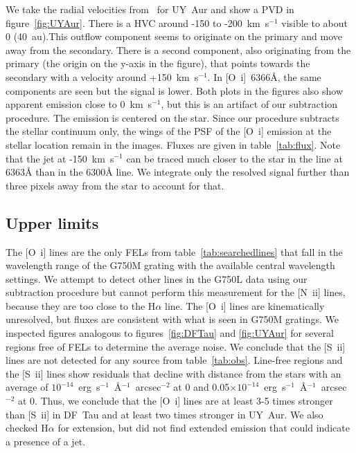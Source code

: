 \documentclass[twocolumn,trackchanges]{aastex63}
\begin{document}
We take the radial velocities from~\citet{2012ApJ...745..119N} for UY~Aur and
show a PVD in figure~\ref{fig:UYAur}.  
There is a HVC around -150 to
-200~km~s$^{-1}$ visible to about 0 (40~au).This outflow component
seems to originate on the primary and move away from the secondary. There is a
second component, also originating from the primary (the origin on the y-axis
in the figure), that points towards the secondary with a velocity around
+150~km~s$^{-1}$. In [O~{\sc i}]~6366\AA{}, the same components are seen but
the signal is lower. Both plots in the figures also show apparent emission
close to 0~km~s$^{-1}$, but this is an artifact of our subtraction
procedure. The emission is centered on the star. Since our procedure subtracts
the stellar continuum only, the wings of the PSF of the [O~{\sc i}] emission at
the stellar location remain in the images. Fluxes are given in
table~\ref{tab:flux}. Note that the jet at -150~km~s$^{-1}$ can be traced much
closer to the star in the line at 6363\AA{} than in the 6300\AA{} line. We
integrate only the resolved signal further than three pixels away from the star
to account for that.



\subsection{Upper limits}
The [O~{\sc i}] lines are the only FELs from table~\ref{tab:searchedlines} that fall in the wavelength range of the G750M grating with the available central wavelength settings. We attempt to detect other lines in the G750L data using our subtraction procedure but cannot perform this measurement for the [N~{\sc ii}] lines, because they are too close to the H$\alpha$ line. The [O~{\sc i}] lines are kinematically unresolved, but fluxes are consistent with what is seen in G750M gratings. We inspected figures analogous to figures~\ref{fig:DFTau} and \ref{fig:UYAur} for several regions free of FELs to determine the average noise. We conclude that the [S~{\sc ii}] lines are not detected for any source from table~\ref{tab:obs}. Line-free regions and the [S~{\sc ii}] lines show residuals that decline with distance from the stars with an average of $10^{-14}$~erg~s$^{-1}$~\AA{}$^{-1}$~arcsec$^{-2}$ at 0 and 0.05$\times10^{-14}$~erg~s$^{-1}$~\AA{}$^{-1}$~arcsec$^{-2}$ at 0. Thus, we conclude that the [O~{\sc i}] lines are at least 3-5 times stronger than [S~{\sc ii}] in DF~Tau and at least two times stronger in UY~Aur. We also checked H$\alpha$ for extension, but did not find extended emission that could indicate a presence of a jet. 
\end{document}
